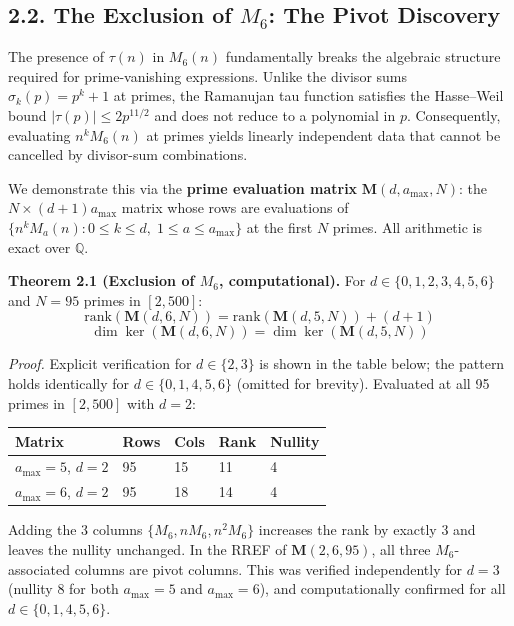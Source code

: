 \documentclass[
  11pt,
]{article}
\newcounter{none} %
\begin{document}
\subsection{\texorpdfstring{2.2. The Exclusion of \(M_6\): The Pivot
Discovery}{2.2. The Exclusion of M\_6: The Pivot Discovery}}\label{the-exclusion-of-m_6-the-pivot-discovery}

The presence of \(\tau(n)\) in \(M_6(n)\) fundamentally breaks the
algebraic structure required for prime-vanishing expressions. Unlike the
divisor sums \(\sigma_k(p) = p^k + 1\) at primes, the Ramanujan tau
function satisfies the Hasse--Weil bound \(|\tau(p)| \leq 2p^{11/2}\)
and does not reduce to a polynomial in \(p\). Consequently, evaluating
\(n^k M_6(n)\) at primes yields linearly independent data that cannot be
cancelled by divisor-sum combinations.

We demonstrate this via the \textbf{prime evaluation matrix}
\(\mathbf{M}(d, a_{\max}, N)\): the \(N \times (d+1) a_{\max}\) matrix
whose rows are evaluations of
\(\{n^k M_a(n) : 0 \leq k \leq d,\; 1 \leq a \leq a_{\max}\}\) at the
first \(N\) primes. All arithmetic is exact over \(\mathbb{Q}\).

\textbf{Theorem 2.1 (Exclusion of \(M_6\), computational).} For
\(d \in \{0, 1, 2, 3, 4, 5, 6\}\) and \(N = 95\) primes in \([2,500]\):
\[\mathrm{rank}(\mathbf{M}(d, 6, N)) = \mathrm{rank}(\mathbf{M}(d, 5, N)) + (d+1)\]
\[\dim\ker(\mathbf{M}(d, 6, N)) = \dim\ker(\mathbf{M}(d, 5, N))\]

\emph{Proof.} Explicit verification for \(d \in \{2, 3\}\) is shown in
the table below; the pattern holds identically for
\(d \in \{0, 1, 4, 5, 6\}\) (omitted for brevity). Evaluated at all 95
primes in \([2, 500]\) with \(d=2\):

{\def\LTcaptype{none} %
\begin{longtable}[]{@{}lllll@{}}
\toprule\noalign{}
Matrix & Rows & Cols & Rank & Nullity \\
\midrule\noalign{}
\endhead
\bottomrule\noalign{}
\endlastfoot
\(a_{\max}=5\), \(d=2\) & 95 & 15 & 11 & 4 \\
\(a_{\max}=6\), \(d=2\) & 95 & 18 & 14 & 4 \\
\end{longtable}
}

Adding the 3 columns \(\{M_6, n M_6, n^2 M_6\}\) increases the rank by
exactly 3 and leaves the nullity unchanged. In the RREF of
\(\mathbf{M}(2, 6, 95)\), all three \(M_6\)-associated columns are pivot
columns. This was verified independently for \(d=3\) (nullity 8 for both
\(a_{\max}=5\) and \(a_{\max}=6\)), and computationally confirmed for
all \(d \in \{0,1,4,5,6\}\).
\end{document}
